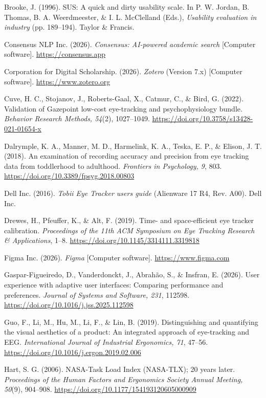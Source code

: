 \documentclass[
]{article}
\begin{document}
Brooke, J. (1996). SUS: A quick and dirty usability scale. In P. W. Jordan, B. Thomas, B. A. Weerdmeester, \& I. L. McClelland (Eds.), \emph{Usability evaluation in industry} (pp. 189--194). Taylor \& Francis.

Consensus NLP Inc. (2026). \emph{Consensus: AI-powered academic search} {[}Computer software{]}. \url{https://consensus.app}

Corporation for Digital Scholarship. (2026). \emph{Zotero} (Version 7.x) {[}Computer software{]}. \url{https://www.zotero.org}

Cuve, H. C., Stojanov, J., Roberts-Gaal, X., Catmur, C., \& Bird, G. (2022). Validation of Gazepoint low-cost eye-tracking and psychophysiology bundle. \emph{Behavior Research Methods, 54}(2), 1027--1049. \url{https://doi.org/10.3758/s13428-021-01654-x}

Dalrymple, K. A., Manner, M. D., Harmelink, K. A., Teska, E. P., \& Elison, J. T. (2018). An examination of recording accuracy and precision from eye tracking data from toddlerhood to adulthood. \emph{Frontiers in Psychology, 9}, 803. \url{https://doi.org/10.3389/fpsyg.2018.00803}

Dell Inc. (2016). \emph{Tobii Eye Tracker user\textquotesingle s guide} (Alienware 17 R4, Rev. A00). Dell Inc.

Drewes, H., Pfeuffer, K., \& Alt, F. (2019). Time- and space-efficient eye tracker calibration. \emph{Proceedings of the 11th ACM Symposium on Eye Tracking Research \& Applications}, 1--8. \url{https://doi.org/10.1145/3314111.3319818}

Figma Inc. (2026). \emph{Figma} {[}Computer software{]}. \url{https://www.figma.com}

Gaspar-Figueiredo, D., Vanderdonckt, J., Abrahão, S., \& Insfran, E. (2026). User experience with adaptive user interfaces: Comparing performance and preferences. \emph{Journal of Systems and Software, 231}, 112598. \url{https://doi.org/10.1016/j.jss.2025.112598}

Guo, F., Li, M., Hu, M., Li, F., \& Lin, B. (2019). Distinguishing and quantifying the visual aesthetics of a product: An integrated approach of eye-tracking and EEG. \emph{International Journal of Industrial Ergonomics, 71}, 47--56. \url{https://doi.org/10.1016/j.ergon.2019.02.006}

Hart, S. G. (2006). NASA-Task Load Index (NASA-TLX); 20 years later. \emph{Proceedings of the Human Factors and Ergonomics Society Annual Meeting, 50}(9), 904--908. \url{https://doi.org/10.1177/154193120605000909}
\end{document}
